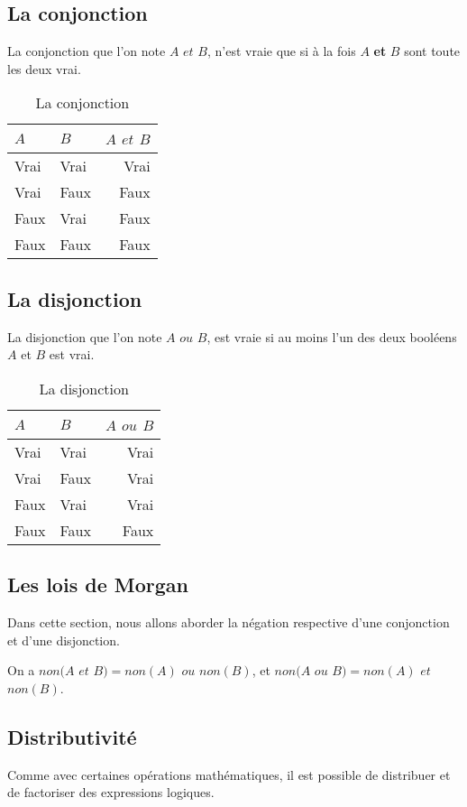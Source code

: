 \subsection{La conjonction}
La conjonction que l'on note $A$ $et$ $B$, n'est vraie que si à la fois $A$ \textbf{et} $B$ sont toute les deux vrai.
\begin{table}[h]
\centering
\begin{tabu} spread \linewidth {|l|l|r|}
\hline
$A$ & $B$ & $A$ $et$ $B$ \\ \hline
Vrai & Vrai & Vrai \\ \hline
Vrai & Faux & Faux \\ \hline
Faux & Vrai & Faux \\ \hline
Faux & Faux & Faux \\ \hline
\end{tabu}
\caption{La conjonction}
\end{table}
\subsection{La disjonction}
La disjonction que l'on note $A$ $ou$ $B$, est vraie si au moins l'un des deux booléens $A$ et $B$ est vrai.
\begin{table}[h]
\centering
\begin{tabu} spread \linewidth {|l|l|r|}
\hline
$A$ & $B$ & $A$ $ou$ $B$ \\ \hline
Vrai & Vrai & Vrai \\ \hline
Vrai & Faux & Vrai \\ \hline
Faux & Vrai & Vrai \\ \hline
Faux & Faux & Faux \\ \hline
\end{tabu}
\caption{La disjonction}
\end{table}
\subsection{Les lois de Morgan}
Dans cette section, nous allons aborder la négation respective d'une conjonction et d'une disjonction.

On a $non(A$ $et$ $B) = non(A)$ $ou$ $non(B)$,
et $non(A$ $ou$ $B) = non(A)$ $et$ $non(B)$.

\subsection{Distributivité}
Comme avec certaines opérations mathématiques, il est possible de distribuer et de factoriser des expressions logiques.

